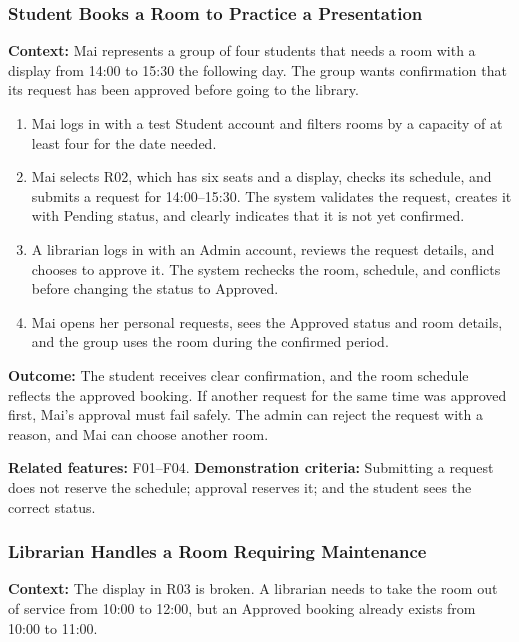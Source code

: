 \subsubsection{Student Books a Room to Practice a Presentation}
\textbf{Context:} Mai represents a group of four students that needs a room with a display from 14:00 to 15:30 the following day. The group wants confirmation that its request has been approved before going to the library.

\begin{enumerate}
  \item Mai logs in with a test Student account and filters rooms by a capacity of at least four for the date needed.
  \item Mai selects R02, which has six seats and a display, checks its schedule, and submits a request for 14:00--15:30. The system validates the request, creates it with Pending status, and clearly indicates that it is not yet confirmed.
  \item A librarian logs in with an Admin account, reviews the request details, and chooses to approve it. The system rechecks the room, schedule, and conflicts before changing the status to Approved.
  \item Mai opens her personal requests, sees the Approved status and room details, and the group uses the room during the confirmed period.
\end{enumerate}

\textbf{Outcome:} The student receives clear confirmation, and the room schedule reflects the approved booking. If another request for the same time was approved first, Mai's approval must fail safely. The admin can reject the request with a reason, and Mai can choose another room.

\textbf{Related features:} F01--F04. \textbf{Demonstration criteria:} Submitting a request does not reserve the schedule; approval reserves it; and the student sees the correct status.

\subsubsection{Librarian Handles a Room Requiring Maintenance}
\textbf{Context:} The display in R03 is broken. A librarian needs to take the room out of service from 10:00 to 12:00, but an Approved booking already exists from 10:00 to 11:00.

